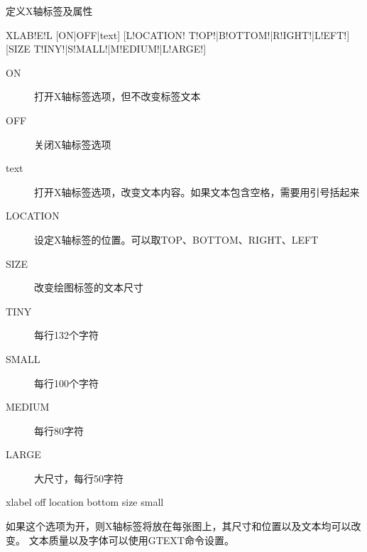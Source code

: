 \label{cmd:xlabel}

定义X轴标签及属性

\begin{SACSTX}
XLAB!E!L [ON|OFF|text] [L!OCATION! T!OP!|B!OTTOM!|R!IGHT!|L!EFT!]
    [SIZE T!INY!|S!MALL!|M!EDIUM!|L!ARGE!]
\end{SACSTX}

\begin{description}
\item [ON] 打开X轴标签选项，但不改变标签文本
\item [OFF] 关闭X轴标签选项
\item [text] 打开X轴标签选项，改变文本内容。如果文本包含空格，需要用引号括起来
\item [LOCATION] 设定X轴标签的位置。可以取TOP、BOTTOM、RIGHT、LEFT
\item [SIZE] 改变绘图标签的文本尺寸
\item [TINY] 每行132个字符
\item [SMALL] 每行100个字符
\item [MEDIUM] 每行80字符
\item [LARGE] 大尺寸，每行50字符
\end{description}

\begin{SACDFT}
xlabel off location bottom size small
\end{SACDFT}

如果这个选项为开，则X轴标签将放在每张图上，其尺寸和位置以及文本均可以改变。
文本质量以及字体可以使用GTEXT命令设置。
